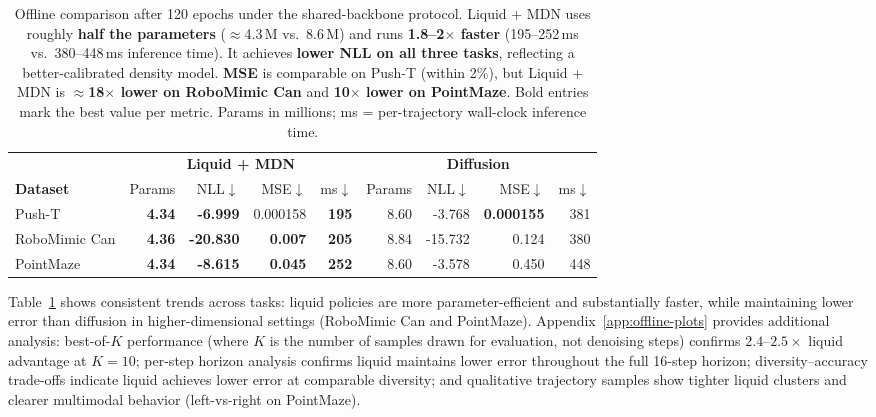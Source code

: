 \documentclass{article}
\begin{document}
\begin{table}[!t]
    \centering
    \small
    \caption{Offline comparison after 120 epochs under the shared-backbone protocol.
    Liquid + MDN uses roughly \textbf{half the parameters} ($\approx$4.3\,M vs.\ 8.6\,M) and runs
    \textbf{1.8--2$\times$ faster} (195--252\,ms vs.\ 380--448\,ms inference time).
    It achieves \textbf{lower NLL on all three tasks}, reflecting a better-calibrated density model.
    \textbf{MSE} is comparable on Push-T (within 2\%), but Liquid + MDN is
    \textbf{$\approx$18$\times$ lower on RoboMimic Can} and \textbf{10$\times$ lower on PointMaze}.
    Bold entries mark the best value per metric.
    Params in millions; ms = per-trajectory wall-clock inference time.}
    \label{tab:offline-tables-all}
    \begin{tabular}{lrrrr@{\quad}rrrr}
        \toprule
        & \multicolumn{4}{c}{\textbf{Liquid + MDN}} & \multicolumn{4}{c}{\textbf{Diffusion}} \\
        \cmidrule(lr){2-5}\cmidrule(lr){6-9}
        \textbf{Dataset}
            & Params & NLL$\downarrow$ & MSE$\downarrow$ & ms$\downarrow$
            & Params & NLL$\downarrow$ & MSE$\downarrow$ & ms$\downarrow$ \\
        \midrule
        Push-T
            & \textbf{4.34} & \textbf{-6.999} & 0.000158 & \textbf{195}
            & 8.60 & -3.768 & \textbf{0.000155} & 381 \\
        RoboMimic Can
            & \textbf{4.36} & \textbf{-20.830} & \textbf{0.007} & \textbf{205}
            & 8.84 & -15.732 & 0.124 & 380 \\
        PointMaze
            & \textbf{4.34} & \textbf{-8.615} & \textbf{0.045} & \textbf{252}
            & 8.60 & -3.578 & 0.450 & 448 \\
        \bottomrule
    \end{tabular}
\end{table}

Table~\ref{tab:offline-tables-all} shows consistent trends across tasks: liquid policies are more parameter-efficient and substantially faster, while maintaining lower error than diffusion in higher-dimensional settings (RoboMimic Can and PointMaze). Appendix~\ref{app:offline-plots} provides additional analysis: best-of-$K$ performance (where $K$ is the number of samples drawn for evaluation, not denoising steps) confirms $2.4$--$2.5\times$ liquid advantage at $K=10$; per-step horizon analysis confirms liquid maintains lower error throughout the full 16-step horizon; diversity--accuracy trade-offs indicate liquid achieves lower error at comparable diversity; and qualitative trajectory samples show tighter liquid clusters and clearer multimodal behavior (left-vs-right on PointMaze).
\end{document}
